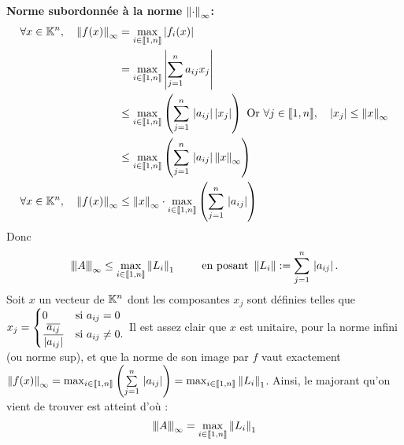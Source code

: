 \documentclass[12pt,a4paper]{article}
\begin{document}
	\textbf{Norme subordonnée à la norme $\norm{\cdot}_{\infty}$:}\begin{align*}
		\forall x\in \ens{K}^n,\quad\norm{f(x)}_{\infty}&=\max_{i\in\llbracket 1,n \rrbracket} \abs{f_i (x)}\\
		&= \max_{i\in\llbracket 1,n \rrbracket} \abs{\somme{j=1}{n} a_{ij} x_j}\\
		&\leq \max_{i\in\llbracket 1,n \rrbracket}\left(\somme{j=1}{n} \abs{a_{ij}}\abs{x_j}\right)
		\text{ Or } \forall j\in\llbracket 1,n \rrbracket, \quad \abs{x_j}\leq \norm{x}_{\infty}\\
		&\leq \max_{i\in\llbracket 1,n \rrbracket}\left(\somme{j=1}{n}\abs{a_{ij}} \norm{x}_{\infty}\right)\\
		\forall x\in \ens{K}^n,\quad  \norm{f(x)}_{\infty} &\leq \norm{x}_{\infty}\cdot\max_{i\in\llbracket 1,n \rrbracket}\left(\somme{j=1}{n}\abs{a_{ij}}\right)			 
	\end{align*}
	Donc $$\fonctnorm{A}_{\infty}\leq \max_{i\in\llbracket 1,n \rrbracket} \norm{L_i}_1 \qquad\text{ en posant } \norm{L_i}:=\somme{j=1}{n}\abs{a_{ij}}.$$
	Soit $x$ un vecteur de $\ens{K}^n$ dont les composantes $x_j$ sont définies telles que $x_{j}= \begin{cases}
		0 & \text{si } a_{ij}=0\\
		\dfrac{\overline{a_{ij}}}{\abs{a_{ij}}} & \text{si } a_{ij}\neq 0.
	\end{cases}$
	Il est assez clair que $x$ est unitaire, pour la norme infini (ou norme sup), et que la norme de son image par $f$ vaut exactement $\norm{f(x)}_{\infty}=\max_{i\in\llbracket 1,n \rrbracket}\left(\somme{j=1}{n}\abs{a_{ij}}\right)=\max_{i\in\llbracket 1,n \rrbracket} \norm{L_i}_1$. Ainsi, le majorant qu'on vient de trouver est atteint d'où : $$\fonctnorm{A}_{\infty}=\max_{i\in\llbracket 1,n \rrbracket}\norm{L_i}_1$$
	
\end{document}
